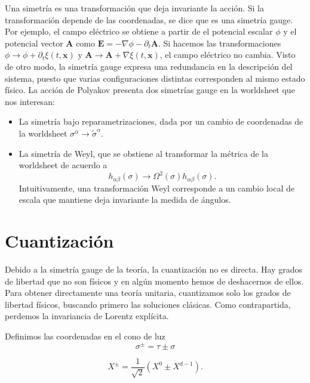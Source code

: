 Una simetría es una transformación que deja invariante la acción. 
Si la transformación depende de las coordenadas, se dice que es una simetría gauge. 
Por ejemplo, el campo eléctrico se obtiene a partir de el potencial escalar $\phi$ y
el potencial vector $\mathbf A$ como $\mathbf E = -\nabla \phi - \partial_t \mathbf A$.
Si hacemos las transformaciones $\phi \to \phi + \partial_t \xi(t,\mathbf x)$ y 
$\mathbf A \to \mathbf A + \nabla \xi(t,\mathbf x)$, el campo eléctrico no cambia.
Visto de otro modo, la simetría gauge expresa una redundancia en la descripción del sistema,  
puesto que varias configuraciones distintas corresponden al mismo estado físico.
La acción de Polyakov presenta dos simetrías gauge en la worldsheet que nos interesan:
\begin{itemize}
  \item La simetría bajo reparametrizaciones, dada por un cambio de coordenadas de la worldsheet $\sigma^\alpha \to \tilde \sigma^\alpha$. 
  \item La simetría de Weyl, que se obstiene al transformar la métrica de la worldsheet de acuerdo 
    a
    \begin{equation}
      h_{\alpha\beta}(\sigma) \to \Omega^2(\sigma) h_{\alpha\beta}(\sigma).
    \end{equation}
    Intuitivamente, una transformación Weyl corresponde a un cambio local de escala que mantiene
    deja invariante la medida de ángulos.
\end{itemize}



\section{Cuantización}

Debido a la simetría gauge de la teoría, la cuantización no es directa.
Hay grados de libertad que no son físicos y en algún momento hemos de deshacernos de ellos.
Para obtener directamente una teoría unitaria, cuantizamos solo los grados de libertad 
físicos, buscando primero las soluciones clásicas. 
Como contrapartida, perdemos la invariancia de Lorentz explícita.

Definimos las coordenadas en el cono de luz
\begin{equation}
  \sigma^\pm=\tau\pm\sigma
\end{equation}

\begin{equation}
  X^\pm=\frac{1}{\sqrt 2} (X^0 \pm X^{d-1}).
\end{equation}


